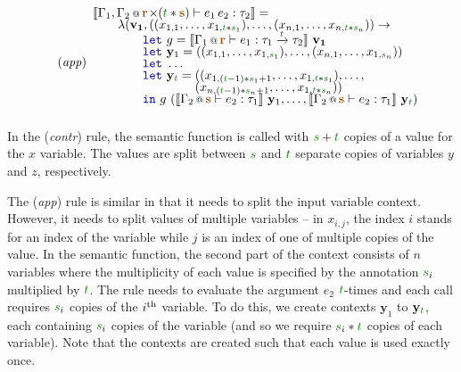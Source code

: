 \begin{equation*}
\hspace{-0.5em}
\tag{\emph{app}}
\begin{array}{l}
\sem{ \coctx{\Gamma_1, \Gamma_2}{\aclrd{\textbf{r}} \cons (\cclrd{t} \ast \aclrd{\textbf{s}})} \vdash e_1 \, e_2 : \tau_2} = \\[-0.25em]
  \qquad\lambda (\mathbf{v_1}, ((x_{1,1}, \ldots, x_{1,\cclrd{t}\ast\cclrd{s}_1}), \ldots, (x_{n,1}, \ldots, x_{n,\cclrd{t}\ast\cclrd{s}_n}) ) \rightarrow \\[-0.25em]
  \qquad\qquad\kvd{let}~g = \sem{ \coctx{\Gamma_1}{\aclrd{\textbf{r}}} \vdash e_1 : \tau_1 \xrightarrow{\cclrd{t}} \tau_2 }~\mathbf{v_1}\\[-0.25em]
  \qquad\qquad\kvd{let}~\mathbf{y}_1 = ((x_{1,1}, \ldots, x_{1,\cclrd{s}_1}), \ldots, (x_{n,1}, \ldots, x_{1,\cclrd{s}_n})  )\\[-0.25em]
  \qquad\qquad\kvd{let}~\ldots \\[-0.25em]
  \qquad\qquad\kvd{let}~\mathbf{y}_{ \cclrd{t} } = ((x_{1,(\cclrd{t}-1)\ast\cclrd{s}_1 + 1}, \ldots, x_{1,\cclrd{t}\ast\cclrd{s}_1}), \ldots, \\[-0.25em]
  \hspace{8.2em}                                         (x_{n,(\cclrd{t}-1)\ast\cclrd{s}_n + 1}, \ldots, x_{1,\cclrd{t}\ast\cclrd{s}_n})  )\\[-0.25em]
  \qquad\qquad\kvd{in}~g~(\sem{ \coctx{\Gamma_2}{\aclrd{\textbf{s}}} \vdash e_2 : \tau_1}~\mathbf{y}_1, \ldots, 
    \sem{ \coctx{\Gamma_2}{\aclrd{\textbf{s}}} \vdash e_2 : \tau_1}~\mathbf{y}_{\cclrd{t}})
\\[1em]
\end{array}
\end{equation*}
%
In the (\emph{contr}) rule, the semantic function is called with $\cclrd{s}+\cclrd{t}$ copies of
a value for the $x$ variable. The values are split between $\cclrd{s}$ and $\cclrd{t}$ separate
copies of variables $y$ and $z$, respectively.

The (\emph{app}) rule is similar in that it needs to split the input variable context. However,
it needs to split values of multiple variables -- in $x_{i,j}$, the index $i$ stands for an
index of the variable while $j$ is an index of one of multiple copies of the value. In the
semantic function, the second
part of the context consists of $n$ variables where the multiplicity of each value is specified 
by the annotation $\cclrd{s}_i$ multiplied by $\cclrd{t}$. The rule needs to evaluate the argument 
$e_2$ $\cclrd{t}$-times and each call requires $\cclrd{s}_i$ copies of the $i^\textnormal{th}$ 
variable. To do this, we create contexts $\mathbf{y}_1$ to $\mathbf{y}_{\cclrd{t}}$, each containing
$\cclrd{s}_i$ copies of the variable (and so we require $\cclrd{s}_i\ast\cclrd{t}$ copies of each 
variable). Note that the contexts are created such that each value is used exactly once.

